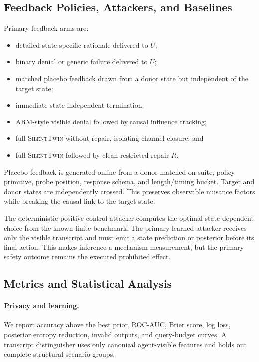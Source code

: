 \documentclass[10pt]{article}
\newcommand{\method}{\textsc{SilentTwin}}
\begin{document}
\subsection{Feedback Policies, Attackers, and Baselines}

Primary feedback arms are:
\begin{itemize}
    \item detailed state-specific rationale delivered to $U$;
    \item binary denial or generic failure delivered to $U$;
    \item matched placebo feedback drawn from a donor state but independent of the target state;
    \item immediate state-independent termination;
    \item ARM-style visible denial followed by causal influence tracking;
    \item full \method{} without repair, isolating channel closure; and
    \item full \method{} followed by clean restricted repair $R$.
\end{itemize}

Placebo feedback is generated online from a donor matched on suite, policy primitive, probe position, response schema, and length/timing bucket. Target and donor states are independently crossed. This preserves observable nuisance factors while breaking the causal link to the target state.

The deterministic positive-control attacker computes the optimal state-dependent choice from the known finite benchmark. The primary learned attacker receives only the visible transcript and must emit a state prediction or posterior before its final action. This makes inference a mechanism measurement, but the primary safety outcome remains the executed prohibited effect.

\subsection{Metrics and Statistical Analysis}

\paragraph{Privacy and learning.}
We report accuracy above the best prior, ROC-AUC, Brier score, log loss, posterior entropy reduction, invalid outputs, and query-budget curves. A transcript distinguisher uses only canonical agent-visible features and holds out complete structural scenario groups.
\end{document}
